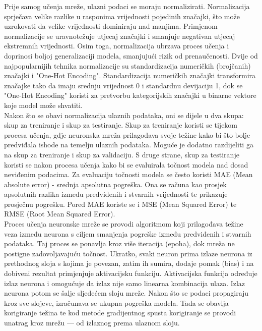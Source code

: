 \documentclass[seminarskirad]{fer}
\begin{document}
Prije samog učenja mreže, ulazni podaci se moraju normalizirati. Normalizacija sprječava velike razlike u rasponima vrijednosti pojedinih značajki, što može uzrokovati da velike vrijednosti dominiraju nad manjima. Primjenom normalizacije se uravnotežuje utjecaj značajki i smanjuje negativan utjecaj ekstremnih vrijednosti. Osim toga, normalizacija ubrzava proces učenja i doprinosi boljoj generalizaciji modela, smanjujući rizik od prenaučenosti. Dvije od najpopularnijih tehnika normalizacije su standardizacija numeričkih (brojčanih) značajki i "One-Hot Encoding". Standardizacija numeričkih značajki transformira značajke tako da imaju srednju vrijednost 0 i standardnu devijaciju 1, dok se "One-Hot Encoding" koristi za pretvorbu kategorijskih značajki u binarne vektore koje model može shvatiti.\\
Nakon što se obavi normalizacija ulaznih podataka, oni se dijele u dva skupa: skup za treniranje i skup za testiranje. Skup za treniranje koristi se tijekom procesa učenja, gdje neuronska mreža prilagođava svoje težine kako bi što bolje predviđala ishode na temelju ulaznih podataka. Moguće je dodatno razdijeliti ga na skup za treniranje i skup za validaciju. S druge strane, skup za testiranje koristi se nakon procesa učenja kako bi se evaluirala točnost modela nad dosad neviđenim podacima. Za evaluaciju točnosti modela se često koristi MAE (Mean absolute error) - srednja apsolutna pogreška. Ona se računa kao prosjek apsolutnih razlika između predviđenih i stvarnih vrijednosti te prikazuje prosječnu pogrešku. Pored MAE koriste se i MSE (Mean Squared Error) te RMSE (Root Mean Squared Error).\\

Proces učenja neuronske mreže se provodi algoritmom koji prilagođava težine veza između neurona s ciljem smanjenja pogreške između predviđenih i stvarnih podataka. Taj proces se ponavlja kroz više iteracija (epoha), dok mreža ne postigne zadovoljavajuću točnost. Ukratko, svaki neuron prima izlaze neurona iz prethodnog sloja s kojima je povezan, zatim ih sumira, dodaje pomak (bias) i na dobiveni rezultat primjenjuje aktivacijsku funkciju. Aktivacijska funkcija određuje izlaz neurona i omogućuje da izlaz nije samo linearna kombinacija ulaza. Izlaz neurona potom se šalje sljedećem sloju mreže. Nakon što se podaci propagiraju kroz sve slojeve, izračunava se ukupna pogreška modela. Tada se obavlja korigiranje težina te kod metode gradijentnog spusta korigiranje se provodi unatrag kroz mrežu — od izlaznog prema ulaznom sloju. 
\end{document}
